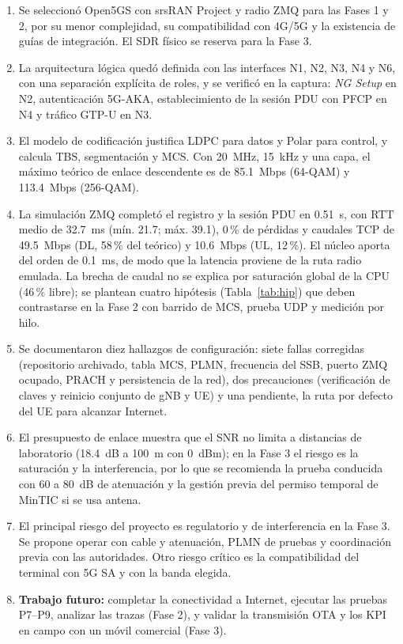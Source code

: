 \documentclass[conference]{IEEEtran}
\begin{document}
\begin{enumerate}
  \item Se seleccionó Open5GS con srsRAN Project y radio ZMQ para las Fases 1 y 2, por su menor complejidad, su compatibilidad con 4G/5G y la existencia de guías de integración. El SDR físico se reserva para la Fase 3.
  \item La arquitectura lógica quedó definida con las interfaces N1, N2, N3, N4 y N6, con una separación explícita de roles, y se verificó en la captura: \textit{NG Setup} en N2, autenticación 5G-AKA, establecimiento de la sesión PDU con PFCP en N4 y tráfico GTP-U en N3.
  \item El modelo de codificación justifica LDPC para datos y Polar para control, y calcula TBS, segmentación y MCS. Con 20~MHz, 15~kHz y una capa, el máximo teórico de enlace descendente es de 85.1~Mbps (64-QAM) y 113.4~Mbps (256-QAM).
  \item La simulación ZMQ completó el registro y la sesión PDU en 0.51~s, con RTT medio de 32.7~ms (mín. 21.7; máx. 39.1), 0\,\% de pérdidas y caudales TCP de 49.5~Mbps (DL, 58\,\% del teórico) y 10.6~Mbps (UL, 12\,\%). El núcleo aporta del orden de 0.1~ms, de modo que la latencia proviene de la ruta radio emulada. La brecha de caudal no se explica por saturación global de la CPU (46\,\% libre); se plantean cuatro hipótesis (Tabla~\ref{tab:hip}) que deben contrastarse en la Fase 2 con barrido de MCS, prueba UDP y medición por hilo.
  
  \item Se documentaron diez hallazgos de configuración: siete fallas corregidas (repositorio archivado, tabla MCS, PLMN, frecuencia del SSB, puerto ZMQ ocupado, PRACH y persistencia de la red), dos precauciones (verificación de claves y reinicio conjunto de gNB y UE) y una pendiente, la ruta por defecto del UE para alcanzar Internet.
  
  \item El presupuesto de enlace muestra que el SNR no limita a distancias de laboratorio (18.4~dB a 100~m con 0~dBm); en la Fase 3 el riesgo es la saturación y la interferencia, por lo que se recomienda la prueba conducida con 60 a 80~dB de atenuación y la gestión previa del permiso temporal de MinTIC si se usa antena.
  \item El principal riesgo del proyecto es regulatorio y de interferencia en la Fase 3. Se propone operar con cable y atenuación, PLMN de pruebas y coordinación previa con las autoridades. Otro riesgo crítico es la compatibilidad del terminal con 5G SA y con la banda elegida.
  \item \textbf{Trabajo futuro:} completar la conectividad a Internet, ejecutar las pruebas P7--P9, analizar las trazas (Fase 2), y validar la transmisión OTA y los KPI en campo con un móvil comercial (Fase 3).
\end{enumerate}
\end{document}

